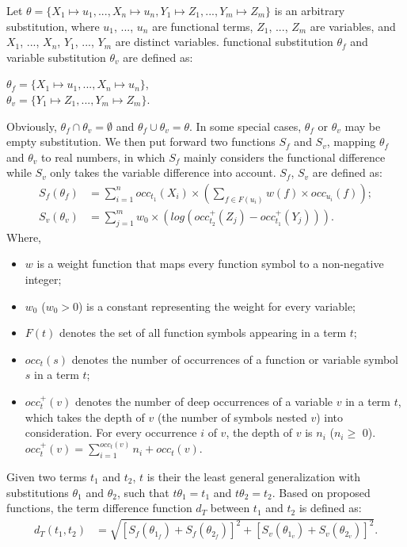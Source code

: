 \documentclass[EPiC]{easychair}
\begin{document}
Let $\theta=\{X_1\mapsto u_1, ..., X_n\mapsto u_n, Y_1\mapsto Z_1, ..., Y_m\mapsto Z_m\}$ is an arbitrary substitution, where $u_1$, ..., $u_n$ are functional terms, $Z_1$, ..., $Z_m$ are variables, and $X_1$, ..., $X_n$, $Y_1$, ..., $Y_m$ are distinct variables. functional substitution $\theta_f$ and variable substitution $\theta_v$ are defined as:
	\begin{center}
		$\theta_{f}=\{X_1\mapsto u_1, ..., X_n\mapsto u_n\}$, \\
		$\theta_{v}=\{Y_1\mapsto Z_1, ..., Y_m\mapsto Z_m\}$.
	\end{center}
	
Obviously, $\theta_f\cap\theta_v =\emptyset$ and $\theta_f\cup\theta_v = \theta$. In some special cases, $\theta_f$ or $\theta_v$ may be empty substitution. We then put forward two functions $S_f$ and $S_v$, mapping $\theta_f$ and $\theta_v$ to real numbers, in which $S_f$ mainly considers the functional difference while $S_v$ only takes the variable difference into account. $S_f$, $S_v$ are defined as: 
	\begin{align}
		S_{f}(\theta_{f}) &= \sum_{i=1}^{n}occ_{t_1}(X_i)\times(\sum_{f\in F(u_i)}w(f)\times occ_{u_i}(f)); \\
		S_{v}(\theta_{v}) &=\sum_{j=1}^{m}w_{0}\times(log(occ_{t_2}^{+}(Z_{j})-occ_{t_1}^{+}(Y_{j}))).
	\end{align}
Where,
\begin{itemize}
	\item $w$ is a weight function that maps every function symbol to a non-negative integer;
	\item $w_0$ ($w_0 > 0$) is a constant representing the weight for every variable;
	\item $F(t)$ denotes the set of all function symbols appearing in a term $t$;
	\item $occ_{t}(s)$ denotes the number of occurrences of a function or variable symbol $s$ in a term $t$;
	\item $occ_{t}^{+}(v)$ denotes the number of deep occurrences of a variable $v$ in a term $t$, which takes the depth of $v$ (the number of symbols nested $v$) into consideration. For every occurrence $i$ of $v$, the depth of $v$ is $n_i$ ($n_i\geq$ 0). $occ_{t}^{+}(v)=\sum_{i=1}^{occ_{t}(v)}n_i+occ_{t}(v)$.
\end{itemize}

Given two terms $t_1$ and $t_2$, $t$ is their the least general generalization with substitutions $\theta_1$ and $\theta_2$, such that $t\theta_1=t_1$ and $t\theta_2=t_2$. Based on proposed functions, the term difference function $d_T$ between $t_1$ and $t_2$ is defined as:
\begin{align}
	d_T(t_1, t_2) & = \sqrt{[S_f(\theta_{1_{f}})+S_f(\theta_{2_{f}})]^2+[S_v(\theta_{1_{v}})+S_v(\theta_{2_{v}})]^2}.
\end{align}
\end{document}

